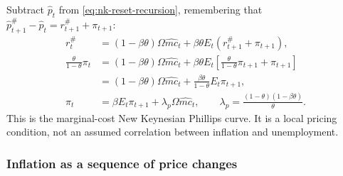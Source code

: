 Subtract $\hat p_t$ from \eqref{eq:nk-reset-recursion}, remembering that
$\hat p_{t+1}^{\#}-\hat p_t=r_{t+1}^{\#}+\pi_{t+1}$:
\begin{align}
 r_t^{\#}&=(1-\beta\theta)\Omega\hat{mc}_t
                +\beta\theta E_t(r_{t+1}^{\#}+\pi_{t+1}),\\
 \frac\theta{1-\theta}\pi_t
 &=(1-\beta\theta)\Omega\hat{mc}_t
  +\beta\theta E_t\left[\frac\theta{1-\theta}\pi_{t+1}+\pi_{t+1}\right]\\
 &=(1-\beta\theta)\Omega\hat{mc}_t
                  +\frac{\beta\theta}{1-\theta}E_t\pi_{t+1},\\
 \pi_t&=\beta E_t\pi_{t+1}+\lambda_p\Omega\hat{mc}_t,
 \qquad\lambda_p=\frac{(1-\theta)(1-\beta\theta)}\theta.
 \label{eq:nk-pc-cost}
\end{align}
This is the marginal-cost New Keynesian Phillips curve. It is a local pricing
condition, not an assumed correlation between inflation and unemployment.

\subsubsection{Inflation as a sequence of price changes}

